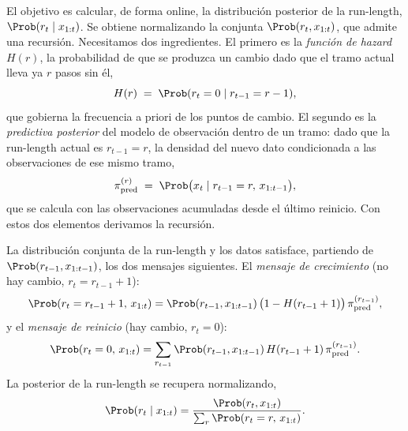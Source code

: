 El objetivo es calcular, de forma online, la distribución posterior de la run-length, $\Prob(r_t \mid x_{1:t})$. Se obtiene normalizando la conjunta $\Prob(r_t, x_{1:t})$, que admite una recursión. Necesitamos dos ingredientes. El primero es la \emph{función de hazard} $H(r)$, la probabilidad de que se produzca un cambio dado que el tramo actual lleva ya $r$ pasos sin él,
\[
H(r) \;=\; \Prob(r_t = 0 \mid r_{t-1} = r - 1),
\]
que gobierna la frecuencia a priori de los puntos de cambio. El segundo es la \emph{predictiva posterior} del modelo de observación dentro de un tramo: dado que la run-length actual es $r_{t-1} = r$, la densidad del nuevo dato condicionada a las observaciones de ese mismo tramo,
\[
\pi^{(r)}_{\mathrm{pred}} \;=\; \Prob\big(x_t \mid r_{t-1} = r,\, x_{1:t-1}\big),
\]
que se calcula con las observaciones acumuladas desde el último reinicio. Con estos dos elementos derivamos la recursión.

\begin{proposicion}
\label{prop:bocpd}
La distribución conjunta de la run-length y los datos satisface, partiendo de $\Prob(r_{t-1}, x_{1:t-1})$, los dos mensajes siguientes. El \emph{mensaje de crecimiento} (no hay cambio, $r_t = r_{t-1} + 1$):
\[
\Prob(r_t = r_{t-1} + 1,\, x_{1:t})
= \Prob(r_{t-1}, x_{1:t-1})\,\big(1 - H(r_{t-1} + 1)\big)\,\pi^{(r_{t-1})}_{\mathrm{pred}},
\]
y el \emph{mensaje de reinicio} (hay cambio, $r_t = 0$):
\[
\Prob(r_t = 0,\, x_{1:t})
= \sum_{r_{t-1}} \Prob(r_{t-1}, x_{1:t-1})\, H(r_{t-1} + 1)\, \pi^{(r_{t-1})}_{\mathrm{pred}}.
\]
La posterior de la run-length se recupera normalizando,
\[
\Prob(r_t \mid x_{1:t}) = \frac{\Prob(r_t, x_{1:t})}{\sum_{r} \Prob(r_t = r,\, x_{1:t})}.
\]
\end{proposicion}

